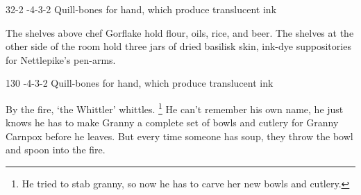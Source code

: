 \documentclass[10pt,twoside]{book}
\begin{document}
%
  {{3}{2}{-2}}%
  {{-4}{-3}{-2}}%
  {%
  }%
  {}%
  {}%
  {Quill-bones for hand, which produce translucent ink}%

The shelves above chef Gorflake hold flour, oils, rice, and beer.
The shelves at the other side of the room hold three jars of dried \gls{basilisk} skin, ink-dye suppositories for Nettlepike's pen-arms.

%
  {{1}{3}{0}}%
  {{-4}{-3}{-2}}%
  {%
  }%
  {}%
  {}%
  {Quill-bones for hand, which produce translucent ink}%

By the fire, `the Whittler' whittles.%
\footnote{He tried to stab granny, so now he has to carve her new bowls and cutlery.}
He can't remember his own name, he just knows he has to make Granny a complete set of bowls and cutlery for Granny Carnpox before he leaves.
But every time someone has soup, they throw the bowl and spoon into the fire.
\end{document}
